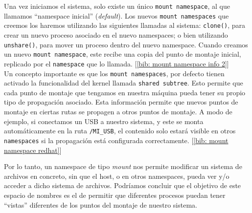 \documentclass[12pt]{article}
\begin{document}
	\noindent Una vez iniciamos el sistema, solo existe un único \texttt{mount namespace}, al que llamamos ``namespace inicial'' (\textit{default}). Los nuevos \texttt{mount namespaces} que creemos los haremos utilizando las siguientes llamadas al sistema: \texttt{clone()}, para crear un nuevo proceso asociado en el nuevo namespaces; o bien utilizando \texttt{unshare()}, para mover un proceso dentro del nuevo namespace. Cuando creamos un nuevo \texttt{mount namespace}, este recibe una copia del punto de montaje inicial, replicado por el \texttt{namespace} que lo llamada. [\ref{bib: mount namespace info 2}] \\
	
	\noindent Un concepto importante es que los \texttt{mount namespaces}, por defecto tienen activado la funcionalidad del kernel llamada \texttt{shared subtree}. Esto permite que cada punto de montaje que tengamos en nuestra máquina pueda tener su propio tipo de propagación asociado. Esta información permite que nuevos puntos de montaje en ciertas rutas se propagen a otros puntos de montaje. A modo de ejemplo, si conectamos un USB a nuestro sistema, y este se monta automáticamente en la ruta \texttt{/MI\_USB}, el contenido solo estará visible en otros \texttt{namespaces} si la propagación está configurada correctamente. [\ref{bib: mount namespace redhat}] \\
	
	
	\par \noindent Por lo tanto, un namespace de tipo \textit{mount} nos permite modificar un sistema de archivos en concreto, sin que el host, o en otros namespaces, pueda ver y/o acceder a dicho sistema de archivos. Podríamos concluir que el objetivo de este espacio de nombres es el de permitir que diferentes procesos puedan tener ``vistas'' diferentes de los puntos del montaje de nuestro sistema. \\
	
\end{document}
